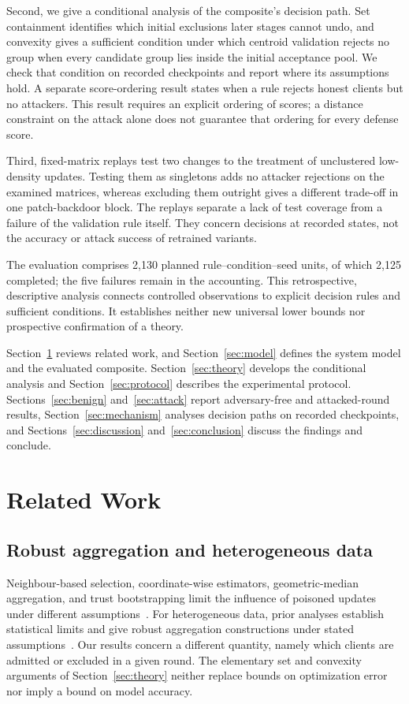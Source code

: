 \documentclass[journal]{IEEEtran}
\begin{document}
Second, we give a conditional analysis of the composite's decision path. Set containment identifies which initial exclusions later stages cannot undo, and convexity gives a sufficient condition under which centroid validation rejects no group when every candidate group lies inside the initial acceptance pool. We check that condition on recorded checkpoints and report where its assumptions hold. A separate score-ordering result states when a rule rejects honest clients but no attackers. This result requires an explicit ordering of scores; a distance constraint on the attack alone does not guarantee that ordering for every defense score.

Third, fixed-matrix replays test two changes to the treatment of unclustered low-density updates. Testing them as singletons adds no attacker rejections on the examined matrices, whereas excluding them outright gives a different trade-off in one patch-backdoor block. The replays separate a lack of test coverage from a failure of the validation rule itself. They concern decisions at recorded states, not the accuracy or attack success of retrained variants.

The evaluation comprises 2{,}130 planned rule--condition--seed units, of which 2{,}125 completed; the five failures remain in the accounting. This retrospective, descriptive analysis connects controlled observations to explicit decision rules and sufficient conditions. It establishes neither new universal lower bounds nor prospective confirmation of a theory.

Section~\ref{sec:related} reviews related work, and Section~\ref{sec:model} defines the system model and the evaluated composite. Section~\ref{sec:theory} develops the conditional analysis and Section~\ref{sec:protocol} describes the experimental protocol. Sections~\ref{sec:benign} and~\ref{sec:attack} report adversary-free and attacked-round results, Section~\ref{sec:mechanism} analyses decision paths on recorded checkpoints, and Sections~\ref{sec:discussion} and~\ref{sec:conclusion} discuss the findings and conclude.

\section{Related Work}\label{sec:related}
\subsection{Robust aggregation and heterogeneous data}
Neighbour-based selection, coordinate-wise estimators, geometric-median aggregation, and trust bootstrapping limit the influence of poisoned updates under different assumptions~\cite{blanchard2017,yin2018,pillutla2022rfa,cao2021fltrust}. For heterogeneous data, prior analyses establish statistical limits and give robust aggregation constructions under stated assumptions~\cite{karimireddy2022bucketing,allouah2023mixing}. Our results concern a different quantity, namely which clients are admitted or excluded in a given round. The elementary set and convexity arguments of Section~\ref{sec:theory} neither replace bounds on optimization error nor imply a bound on model accuracy.
\end{document}
